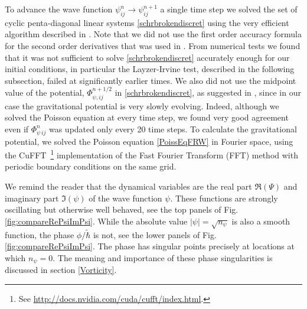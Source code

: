 \documentclass[twocolumn, nofootinbib, showpacs, superscriptaddress]{revtex4-1}
\newcommand{\thbar}{\tilde\hbar}
\begin{document}
To advance the wave function $\psi_{ij}^{n} \rightarrow \psi_{ij}^{n+1}$ a single time step we solved the set of cyclic penta-diagonal linear 
systems \eqref{schrbrokendiscret}  using the very efficient algorithm  described in  \cite{JiaJiang2013}. 
Note that we did not use the first order accuracy formula for the second order derivatives that was used in \cite{G95}. 
From numerical tests we found that it was not sufficient to solve \eqref{schrbrokendiscret} accurately enough for our initial conditions, 
in particular the Layzer-Irvine test, described in the following subsection, failed at significantly earlier times. 
We also did not use the midpoint value of the potential, $\varPhi_{\psi,ij}^{n+1/2}$ in \eqref{schrbrokendiscret}, as suggested in \cite{G95}, since in our case the gravitational potential is very slowly evolving. 
Indeed, although we solved the Poisson equation at every time step, 
we found very good agreement even if  $\varPhi^n_{\psi\, ij}$ was updated only every 20 time steps. 
To calculate the gravitational potential, we solved the Poisson equation \eqref{PoissEqFRW} in Fourier space, using the
CuFFT~\footnote{See \url{http://docs.nvidia.com/cuda/cufft/index.html}.} implementation of
 the  Fast Fourier Transform (FFT) method with periodic boundary conditions on the same grid. 


We remind the reader that the dynamical variables are the real part $\Re(\varPsi)$ and imaginary part $\Im(\psi)$ of the wave function $\psi$. 
These functions are strongly oscillating but otherwise well behaved, see the top panels of Fig.\,\ref{fig:compareRePsiImPsi}.
While the absolute value $|\psi| = \sqrt{n_\psi}$ is also a smooth function, the phase $\phi/\thbar$ is not, see the lower panels of Fig.\ref{fig:compareRePsiImPsi}.
The phase has singular points precisely at locations at which $n_\psi=0$. 
The meaning and importance of these phase singularities is discussed in section \ref{Vorticity}.
\end{document}
